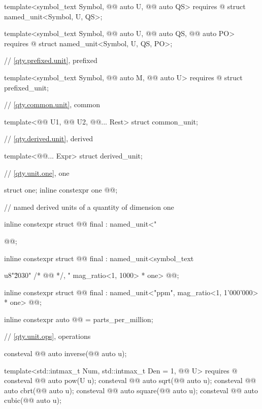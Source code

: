 \begin{codeblock}
{template<symbol_text Symbol, @@ auto U, @@ auto QS>
  requires @\seebelownc@
struct named_unit<Symbol, U, QS>;

template<symbol_text Symbol, @@ auto U, @@ auto QS,
         @@ auto PO>
  requires @\seebelownc@
struct named_unit<Symbol, U, QS, PO>;

// \ref{qty.prefixed.unit}, prefixed

template<symbol_text Symbol, @@ auto M, @@ auto U>
  requires @\seebelownc@
struct prefixed_unit;

// \ref{qty.common.unit}, common

template<@@ U1, @@ U2, @@... Rest>
struct common_unit;

// \ref{qty.derived.unit}, derived

template<@@... Expr>
struct derived_unit;

// \ref{qty.unit.one}, one

struct one;
inline constexpr one @@{};

// named derived units of a quantity of dimension one

inline constexpr struct @@ final : named_unit<"%
} @@;

inline constexpr struct @@ final :
    named_unit<symbol_text{u8"\u2030" /* @@ */, "%
               mag_ratio<1, 1000> * one> {
} @@;

inline constexpr struct @@ final :
    named_unit<"ppm", mag_ratio<1, 1'000'000> * one> {
} @@;

inline constexpr auto @@ = parts_per_million;

// \ref{qty.unit.ops}, operations

consteval @@ auto inverse(@@ auto u);

template<std::intmax_t Num, std::intmax_t Den = 1, @@ U>
  requires @\seebelownc@
consteval @@ auto pow(U u);
consteval @@ auto sqrt(@@ auto u);
consteval @@ auto cbrt(@@ auto u);
consteval @@ auto square(@@ auto u);
consteval @@ auto cubic(@@ auto u);

}
\end{codeblock}

